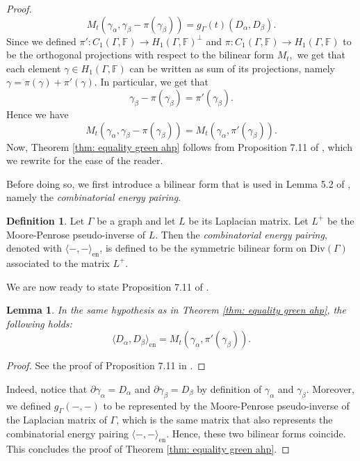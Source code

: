 \documentclass[a4paper,12 pt,titlepage,twoside]{book}
\newcommand{\numberset}{\mathbb}
\newcommand{\F}{\numberset{F}}
\theoremstyle{plain}
\theoremstyle{theorem}
\newtheorem{lemma}[thm]{Lemma}
\theoremstyle{definition}
\newtheorem{defn}[thm]{Definition}
\theoremstyle{remark}
\begin{document}
\begin{proof}
\begin{equation}
		M_t(\gamma_\alpha, \gamma_\beta - \pi(\gamma_\beta)) = g_\Gamma(t)(D_\alpha, D_\beta).
		\end{equation}
		Since we defined $\pi' \colon C_1(\Gamma, \F) \rightarrow H_1(\Gamma, \F)^\bot$ and $\pi \colon C_1(\Gamma,\F) \rightarrow H_1(\Gamma,\F)$ to be the orthogonal projections with respect to the bilinear form $M_t,$ we get that each element $\gamma \in H_1(\Gamma, \F)$ can be written as sum of its projections, namely $\gamma = \pi(\gamma)+ \pi'(\gamma).$ In particular, we get that $$\gamma_\beta - \pi(\gamma_\beta) = \pi'(\gamma_\beta).$$ Hence we have $$M_t(\gamma_\alpha, \gamma_\beta- \pi(\gamma_\beta)) = M_t(\gamma_\alpha, \pi'(\gamma_\beta)).$$
		Now, Theorem \ref{thm: equality green ahp} follows from Proposition 7.11 of \cite{de2018metric}, which we rewrite for the ease of the reader. 
		
		Before doing so, we first introduce a bilinear form that is used in Lemma 5.2 of \cite{de2018metric}, namely the \emph{combinatorial energy pairing}. 
		\begin{defn}
			Let $\Gamma$ be a graph and let $L$ be its Laplacian matrix. Let $L^+$ be the Moore-Penrose pseudo-inverse of $L$. Then the \emph{combinatorial energy pairing}, denoted with $\langle -, - \rangle_{\text{en}}$, is defined to be the symmetric bilinear form on $\text{Div}(\Gamma)$ associated to the matrix $L^+$.
		\end{defn}
		We are now ready to state Proposition 7.11 of \cite{de2018metric}.
		\begin{lemma}
			In the same hypothesis as in Theorem \ref{thm: equality green ahp}, the following holds:
			$$\langle D_\alpha, D_\beta \rangle_{\text{en}} = M_t(\gamma_\alpha, \pi'(\gamma_\beta)).$$
		\end{lemma} 
		\begin{proof}
			See the proof of Proposition 7.11 in \cite{de2018metric}.
		\end{proof}
		Indeed, notice that $\partial \gamma_\alpha = D_\alpha$ and $\partial \gamma_\beta = D_\beta$ by definition of $\gamma_\alpha$ and $\gamma_\beta$. Moreover, we defined $g_\Gamma(-,-)$ to be represented by the Moore-Penrose pseudo-inverse of the Laplacian matrix of $\Gamma$, which is the same matrix that also represents the combinatorial energy pairing $\langle -,- \rangle_{\text{en}}$. Hence, these two bilinear forms coincide. This concludes the proof of Theorem \ref{thm: equality green ahp}.
	\end{proof}
	
\end{document}
